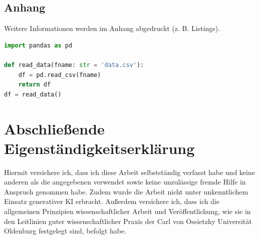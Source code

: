 \documentclass[11pt]{scrartcl}
\begin{document}


\newpage

\begin{appendix}

\section{Anhang}
Weitere Informationen werden im Anhang abgedruckt (z. B. Listings).

\begin{lstlisting}[language=Python, caption=Python example]
import pandas as pd

def read_data(fname: str = 'data.csv'):
    df = pd.read_csv(fname)
    return df
df = read_data()
\end{lstlisting}

	
\end{appendix}

\clearpage


\clearpairofpagestyles

\section*{Abschließende Eigenständigkeitserklärung}

\vspace*{0.5cm} 

Hiermit versichere ich, dass ich diese Arbeit selbstständig verfasst habe und keine anderen als die angegebenen verwendet sowie keine unzulässige fremde Hilfe in Anspruch genommen habe. 
Zudem wurde die Arbeit nicht unter unkenntlichem Einsatz generativer KI erbracht. 
Außerdem versichere ich, dass ich die allgemeinen Prinzipien wissenschaftlicher Arbeit und Veröffentlichung, wie sie in den Leitlinien guter wissenschaftlicher Praxis der Carl von Ossietzky Universität Oldenburg festgelegt sind, befolgt habe.
\end{document}
